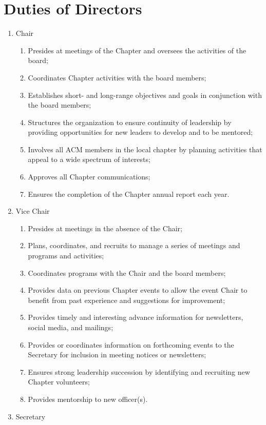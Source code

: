 \section{Duties of Directors}
\begin{enumerate}
	\item Chair
	\begin{enumerate}
		\item Presides at meetings of the Chapter and oversees the activities of the board;
		\item Coordinates Chapter activities with the board members;
		\item Establishes short- and long-range objectives and goals in conjunction with the board members;
		\item Structures the organization to ensure continuity of leadership by providing opportunities for new leaders to develop and to be mentored;
		\item Involves all ACM members in the local chapter by planning activities that appeal to a wide spectrum of interests;
		\item Approves all Chapter communications;
		\item Ensures the completion of the Chapter annual report each year.
	\end{enumerate}
	\item Vice Chair
	\begin{enumerate}
		\item Presides at meetings in the absence of the Chair;
		\item Plans, coordinates, and recruits to manage a series of meetings and programs and activities;
		\item Coordinates programs with the Chair and the board members;
		\item Provides data on previous Chapter events to allow the event Chair to benefit from past experience and suggestions for improvement;
		\item Provides timely and interesting advance information for newsletters, social media, and mailings;
		\item Provides or coordinates information on forthcoming events to the Secretary for inclusion in meeting notices or newsletters;
		\item Ensures strong leadership succession by identifying and recruiting new Chapter volunteers;
		\item Provides mentorship to new officer(s).
	\end{enumerate}
	\item Secretary

\end{enumerate}
